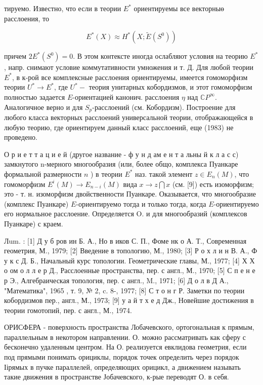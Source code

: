\documentclass[10pt]{article}
\begin{document}
тируемо. Известно, что если в теории $E^{*}$ ориентируемы все векторныө расслоения, то



\[

E^{*}(X) \approx H^{*}\left(X ; \tilde{E}\left(S^{0}\right)\right)

\]



причем $2 E^{*}\left(S^{0}\right)=0$. В этом контексте иногда ослабляют условия на теорию $E^{*}$, напр. снимают условие коммутативности умножения и т. Д. Для любой теории $E^{*}$, в к-рой все комплексные расслоения ориентируемы, имеется гомоморфизм теории $U^{*} \rightarrow E^{*}$, где $U^{*}-$ теория унитарных кобордизмов, и этот гомоморфизм полностью задается $E$-ориентацией канонич. расслоения $\eta$ над $\mathbb{C} P^{\infty}$. Аналогичное верно и для $S_{p}$-расслоений (см. Кобордизм). Построение для любого класса векторных расслоений универсальной теории, отображающейся в любую теорию, где ориентируем данный класс расслоений, еще (1983) не проведено.



О р и е т т а ц и е й (другое название - ф у н д ам е н т а льны й к л а с с) замкнутого n-мерного многообразия (или, более общо, комплекса Пуанкаре формальной размерности $n$ ) в теории $E^{*}$ наз. такой элемент $z \in E_{n}(M)$, что гомоморфизм $E^{i}(M) \rightarrow E_{n-i}(M)$ вида $x \rightarrow z \bigcap x$ (см. [9]) есть изоморфизм; это - т. н. изоморфизм двойственности Пуанкаре. Оказывается, что многообразие (комплекс Пуанкаре) $E$-ориентируемо тогда и только тогда, когда $E$-ориентируемо его нормальное расслоение. Определяется $\mathrm{O}$. и для многообразий (комплексов Пуанкаре) с краем.



Лum. : [1] Д у б ров ин Б. А., Но в иков С. П., Фоме нк о А. Т., Современная геометрия, М., 1979; [2] Введение в топологию, М., 1980; [3] Р о х л и н В. А., Ф у к с Д. Б., Начальный курс топологии. Геометрические главы, М., 1977; [4] Х Х о ом о л л е р Д., Расслоенные пространства, пер. с англ., М., 1970; [5] С п е н е р Э., Алгебраическая топология, пер. с англ., M., 1971; [6] Д о л в Д А., "Математика", 1965 , т. 9, № 2, c. 8-, 1977; [8] С т о н г Р. Заметки по теории кобордизмов пер., англ., М., 1973; [9] у а й т х е д Дж., Новейшие достижения в теории гомотопий, пер. с англ., М., 1974.



ОРИСФЕРА - поверхность пространства Лобачевского, ортогональная к прямым, параллельным в некотором направлении. О. можно рассматривать как сферу с бесконечно удаленным центром. На О. реализуется евклидова геометрия, если под прямыми понимать орициклы, порядок точек определить через порядок Іірямых в пучке параллелей, определяющих орицикл, а движением называть такие движения в пространстве Јобачевского, к-рые переводят О. в себя.
\end{document}
